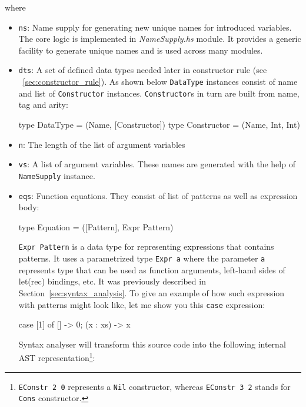 \documentclass[12pt,a4paper]{report}
\begin{document}
where
\begin{itemize}
  \item \texttt{ns}: Name supply for generating new unique names for
    introduced variables. The core logic is implemented in
    \textit{NameSupply.hs} module. It provides a generic facility to generate
    unique names and is used across many modules.
  \item \texttt{dts}: A set of defined data types needed later in constructor
    rule (see ~\ref{sec:constructor_rule}). As shown below \texttt{DataType}
    instances consist of name and list of \texttt{Constructor} instances.
    \texttt{Constructor}s in turn are built from name, tag and arity:

\vspace*{0.2in}
\begin{code}[style=haskell]
type DataType = (Name, [Constructor])
type Constructor = (Name, Int, Int)
\end{code}

  \item \texttt{n}: The length of the list of argument variables
  \item \texttt{vs}: A list of argument variables. These names are generated
    with the help of \texttt{NameSupply} instance.
  \item \texttt{eqs}: Function equations. They consist of list of patterns as
    well as expression body:

\vspace*{0.2in}
\begin{code}[style=haskell]
type Equation = ([Pattern], Expr Pattern)
\end{code}

\texttt{Expr Pattern} is a data type for representing expressions that contains
patterns. It uses a parametrized type \texttt{Expr a} where the parameter
\texttt{a} represents type that can be used as function arguments, left-hand
sides of let(rec) bindings, etc. It was previously described in
Section~\ref{sec:syntax_analysis}.
To give an example of how such expression with patterns might look like, let me
show you this \texttt{case} expression:

\vspace*{0.2in}
\begin{code}[style=haskell]
case [1] of
    []       -> 0;
    (x : xs) -> x
\end{code}

Syntax analyser will transform this source code into the following internal AST
representation\footnote{\texttt{EConstr 2 0} represents a \texttt{Nil}
constructor, whereas \texttt{EConstr 3 2} stands for \texttt{Cons} constructor.}:


\end{itemize}
\end{document}
